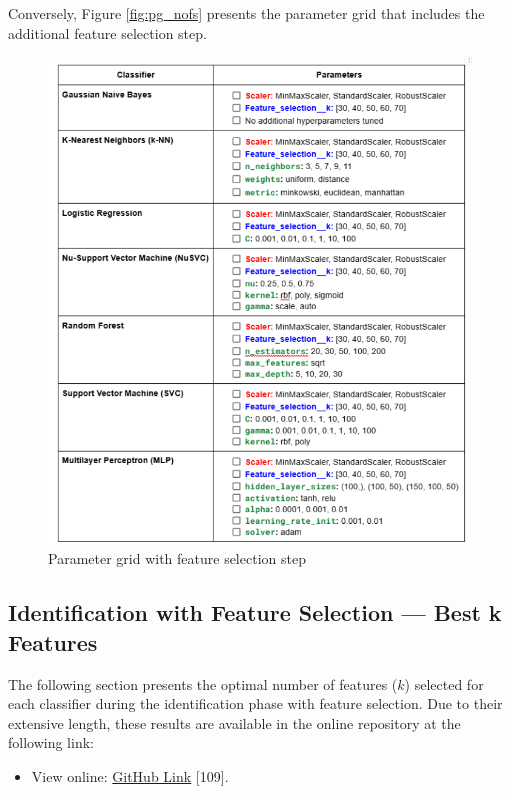 \documentclass{article}
\begin{document}
Conversely, Figure \ref{fig:pg_nofs} presents the parameter grid that includes the additional feature selection step.

\begin{figure}[ht]
    \centering
    \includegraphics[width = 0.8
    \textwidth]{Images/Results/fs.png}
    \caption{Parameter grid with feature selection step}
    \label{fig:pg_fs}
\end{figure}

\FloatBarrier

\subsection{Identification with Feature Selection — Best k Features}
\label{subsec:id_fs_k}

The following section presents the optimal number of features ($k$) selected for each classifier during the identification phase with feature selection.
Due to their extensive length, these results are available in the online repository at the following link:

\begin{itemize}
    \item View online: 
    \href{https://github.com/DavideMascheroni99/movingText/tree/main/Programs/Machine_Learning/Machine_Learning_results/Identification_results/Identification_KBest/Feature}
    {GitHub Link} [109].
\end{itemize}
\FloatBarrier
\end{document}
